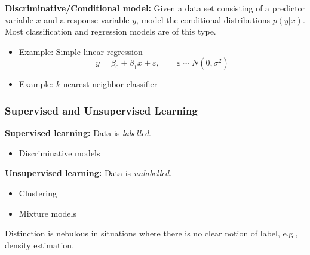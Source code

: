 \documentclass[xcolor={dvipsnames}]{beamer}
\renewcommand{\epsilon}{\varepsilon}
\begin{document}
\begin{frame}
    \setlength\parskip{0.75em}
    \textbf{Discriminative/Conditional model:} Given a data set consisting of a predictor variable $x$ and
    a response variable $y$, model the conditional distributions $p(y|x)$.
    Most classification and regression models are of this type.
    \begin{itemize}
        \item Example: Simple linear regression
        \[
            y=\beta_0 + \beta_1x + \epsilon,\qquad \epsilon\sim N(0,\sigma^2)
        \]
        \item Example: $k$-nearest neighbor classifier
    \end{itemize}
\end{frame}

\begin{frame}
    \frametitle{Supervised and Unsupervised Learning}
    \setlength\parskip{0.75em}

    \textbf{Supervised learning:} Data is \emph{labelled}.
    \begin{itemize}
        \item Discriminative models
    \end{itemize}

    \textbf{Unsupervised learning:} Data is \emph{unlabelled}.
    \begin{itemize}
        \item Clustering
        \item Mixture models
    \end{itemize}

    Distinction is nebulous in situations where there is no clear notion of label, e.g., density estimation.
\end{frame}
\end{document}
